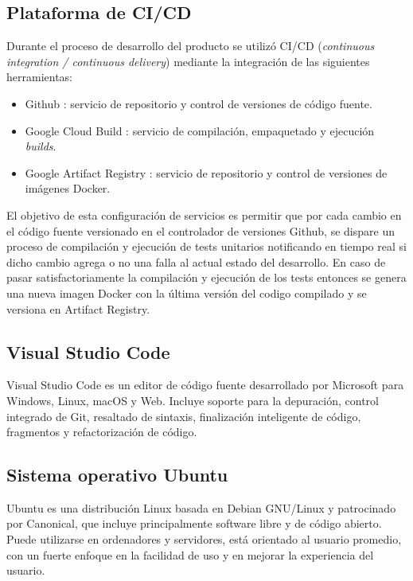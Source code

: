 \subsection{Plataforma de CI/CD}
Durante el proceso de desarrollo del producto se utilizó CI/CD (\textit{continuous integration / continuous delivery}) mediante la integración de las siguientes herramientas:

\begin{itemize}
	\item Github \cite{SoftwareTool_Github}: servicio de repositorio y control de versiones de código fuente.
	\item Google Cloud Build \cite{SoftwareTool_CloudBuild}: servicio de compilación, empaquetado y ejecución \textit{builds}.
	\item Google Artifact Registry \cite{SoftwareTool_ArtifactRegistry}: servicio de repositorio y control de versiones de imágenes Docker.
\end{itemize}

El objetivo de esta configuración de servicios es permitir que por cada cambio en el código fuente versionado en el controlador de versiones Github, se dispare un proceso de compilación y ejecución de tests unitarios notificando en tiempo real si dicho cambio agrega o no una falla al actual estado del desarrollo. En caso de pasar satisfactoriamente la compilación y ejecución de los tests entonces se genera una nueva imagen Docker con la última versión del codigo compilado y se versiona en Artifact Registry.

\subsection{Visual Studio Code}

Visual Studio Code \cite{vscode_website} es un editor de código fuente desarrollado por Microsoft para Windows, Linux, macOS y Web. Incluye soporte para la depuración, control integrado de Git, resaltado de sintaxis, finalización inteligente de código, fragmentos y refactorización de código.


\subsection{Sistema operativo Ubuntu}
Ubuntu \cite{ubuntu_website} es una distribución Linux basada en Debian GNU/Linux y patrocinado por Canonical, que incluye principalmente software libre y de código abierto. Puede utilizarse en ordenadores y servidores, está orientado al usuario promedio, con un fuerte enfoque en la facilidad de uso y en mejorar la experiencia del usuario.




